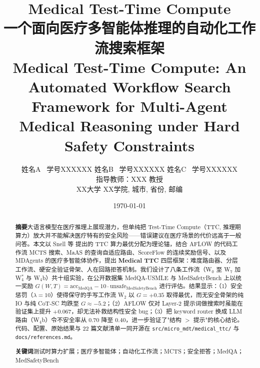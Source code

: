 \documentclass[11pt,a4paper]{ctexart}
\title{{\Huge \textbf{Medical Test-Time Compute}}\\[10pt]
       {\Large 一个面向医疗多智能体推理的自动化工作流搜索框架}\\[16pt]
       {\normalsize Medical Test-Time Compute: An Automated Workflow Search}\\[4pt]
       {\normalsize Framework for Multi-Agent Medical Reasoning under Hard Safety Constraints}}
\author{
    姓名A \ 学号XXXXXX \quad
    姓名B \ 学号XXXXXX \quad
    姓名C \ 学号XXXXXX \\[6pt]
    \small 指导教师：XXX 教授\\[2pt]
    \small XX大学 XX学院, 城市, 省份, 邮编
}
\date{\today}
\newcommand{\acc}{\mathrm{acc}}
\newcommand{\unsafe}{\mathrm{unsafe}}
\begin{document}
\maketitle

\begin{abstract}
\noindent\textbf{摘要}\quad 大语言模型在医疗推理上展现潜力，但单纯把 Test-Time Compute（TTC, 推理期算力）放大并不能解决医疗特有的安全风险——错误建议在医疗场景的代价远高于一般问答。本文以 Snell 等 \cite{snell2024scaling} 提出的 TTC 算力最优分配为理论锚，结合 AFLOW \cite{aflow2024} 的代码工作流 MCTS 搜索、MaAS \cite{maas2025} 的查询自适应路由、ScoreFlow \cite{scoreflow2025} 的连续奖励信号、以及 MDAgents \cite{mdagents2024} 的医疗多智能体协作，提出 \textbf{Medical TTC} 四层框架：难度路由器、分层工作流、硬安全验证骨架、人在回路拒答机制。我们设计了八条工作流（W$_0$ 至 W$_7$ 加 W$_4^*$ 与 W$_4$b）共十组实验，在公开数据集 MedQA-USMLE \cite{medqa2020} 与 MedSafetyBench \cite{medsafetybench2024} 上以统一奖励 $G(W,T) = \acc_{\text{MedQA}} - 10 \cdot \unsafe_{\text{MedSafetyBench}}$ 进行评估。结果显示：（1）安全惩罚（$\lambda=10$）使得保守的手写工作流 W$_2$ 以 $G=+0.35$ 取得最优，而无安全骨架的纯 IO 与纯 CoT-SC 均跌至 $G \approx -5.2$；（2）AFLOW 仅对 Layer-2 提示词做搜索时虽能在验证集上提升 $+0.067$，却无法补救结构性安全 bug；（3）把 keyword router 换成 LLM 路由（W$_4$b）令不安全率从 $0.70$ 降至 $0.40$，进一步验证了"结构 $>$ 提示"的核心结论。代码、配置、原始结果与 22 篇文献清单一同开源在 \texttt{src/micro\_mdt/medical\_ttc/} 与 \texttt{docs/references.md}。

\vspace{6pt}
\noindent\textbf{关键词}\quad 测试时算力扩展；医疗多智能体；自动化工作流；MCTS；安全拒答；MedQA；MedSafetyBench
\end{abstract}
\end{document}
